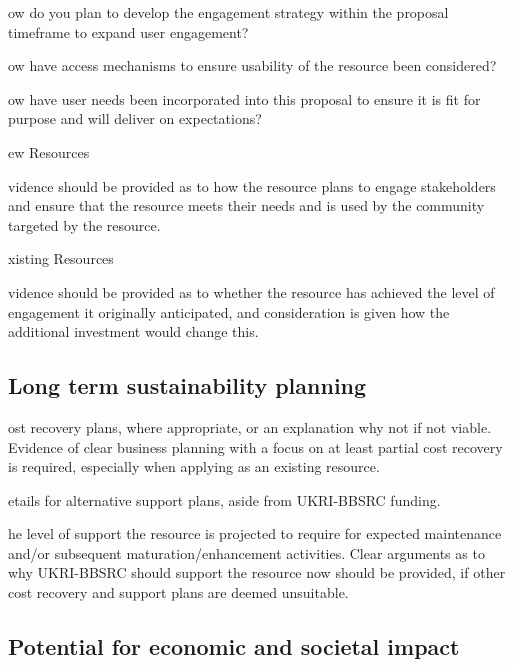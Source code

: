 \documentclass[a4paper,11point]{article}
\def\ii#1\par{{\color{blue!40}\sl #1}\par}
\def\iibf#1\par{{\color{blue!40}\sl\bfseries #1}\par}
\def\iitem#1\par{\ii\begin{itemize}[nosep]\item #1 \end{itemize}\par}
\begin{document}
\iitem How do you plan to develop the engagement strategy within the 
proposal timeframe to expand user engagement? 

\iitem How have access mechanisms to ensure usability of the resource 
been considered? 

\iitem How have user needs been incorporated into this proposal to ensure 
it is fit for purpose and will deliver on expectations? 

\iibf New Resources
  
\ii Evidence should be provided as to how the resource plans to engage
stakeholders and ensure that the resource meets their needs and is
used by the community targeted by the resource.

\iibf Existing Resources

\ii Evidence should be provided as to whether the resource has
achieved the level of engagement it originally anticipated, and
consideration is given how the additional investment would change
this.  

\subsection{Long term sustainability planning}
\ii{
In addition, the case for support should outline considerations for the long-
term sustainability of the resource beyond UKRI-BBSRC funding, as well as 
the true cost of running and maintaining the resource in question. 
The proposal should include: }

\iitem Cost recovery plans, where appropriate, or an explanation why
not if not viable. Evidence of clear business planning with a focus on
at least partial cost recovery is required, especially when applying
as an existing resource.

\iitem Details for alternative support plans, aside from UKRI-BBSRC 
funding. 

\iitem The level of support the resource is projected to require for expected 
maintenance and/or subsequent maturation/enhancement activities. 
Clear arguments as to why UKRI-BBSRC should support the resource now 
should be provided, if other cost recovery and support plans are deemed 
unsuitable.  


\subsection{Potential for economic and societal impact}
\ii{Outline how the outputs of the proposed resource will contribute to 
knowledge and how this may have the potential for economic return or 
societal benefits. Impact activities should be integrated into appropriate 
sections of the case for support, not presented as an independent work 
package. }
\end{document}
